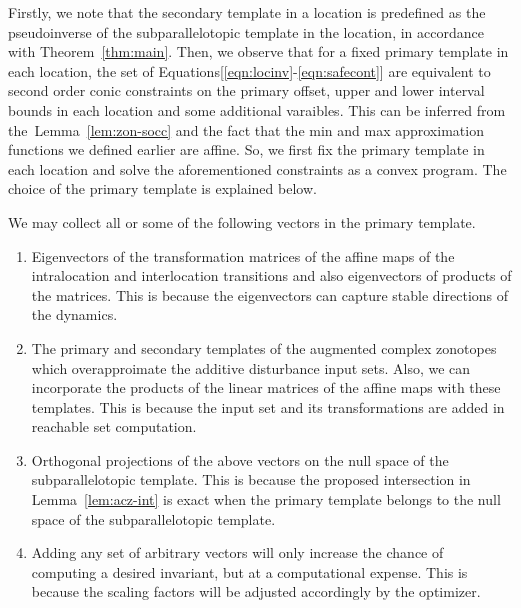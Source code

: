   Firstly, we note that the secondary
template in a location is predefined as the pseudoinverse of the
subparallelotopic template in the location, in accordance with
Theorem~\ref{thm:main}.  Then, we observe that for a fixed primary
template in each location, the set of
Equations[\ref{eqn:locinv}-\ref{eqn:safecont}] are equivalent to
second order conic constraints on the primary offset, upper and lower
interval bounds in each location and some additional varaibles.  This
can be inferred from the~Lemma~\ref{lem:zon-socc} and the fact that
the min and max approximation functions we defined earlier are
affine. So, we first fix the primary template in each location and
solve the aforementioned constraints as a convex program.  The choice
of the primary template is explained below.

  We may collect all or some of
the following vectors in the primary template.
%
\begin{enumerate}
\item Eigenvectors of the transformation matrices of the affine maps
  of the intralocation and interlocation transitions and also
  eigenvectors of products of the matrices.  This is because the
  eigenvectors can capture stable directions of the dynamics.
\item The primary and secondary templates of the augmented complex
  zonotopes which overapproimate the additive disturbance input sets.
  Also, we can incorporate the products of the linear matrices of the
  affine maps with these templates.  This is because the input set and
  its transformations are added in reachable set
  computation.
\item Orthogonal projections of the above vectors on the null
  space of the subparallelotopic template.  This is because the
  proposed intersection in Lemma~\ref{lem:acz-int} is exact when the
  primary template belongs to the null space of the subparallelotopic
  template.
\item Adding any set of arbitrary vectors will only increase the chance of computing a desired
  invariant, but at a computational expense.  This is because the
  scaling factors will be adjusted accordingly by the optimizer. 
\end{enumerate}
